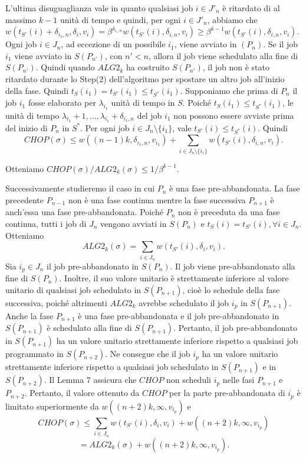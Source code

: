 \documentclass[12pt]{article}
\begin{document}
L'ultima disuguaglianza vale in quanto qualsiasi job $i \in J'_{n}$ è ritardato di al massimo $k - 1$ unità di tempo e quindi, per ogni $i \in J'_{n}$, abbiamo che $w(t_{S'}(i) + \delta_{i_{1}, n}, \delta_{i}, v_{i}) = \beta^{\delta_{i_{1},n}} w(t_{S'}(i), \delta_{i, n}, v_{i}) \geq \beta^{k - 1} w (t_{S'}(i), \delta_{i,n}, v_{i})$. Ogni job $i \in J_{n}$, ad eccezione di un possibile $i_{1}$, viene avviato in $ (P_{n})$. Se il job $i_{1}$ viene avviato in $S(P_{n'})$, con $n' < n$, allora il job viene schedulato alla fine di $S(P_{n'})$. Quindi quando $ALG2_{k}$ ha costruito $S(P_{n'})$, il job non è stato ritardato durante lo Step(2) dell'algoritmo per spostare un altro job all'inizio della fase. Quindi $t_{S}(i_{1}) = t_{S'}(i_{1}) \leq t_{S^{*}}(i_{1})$. Supponiamo che prima di $P_{n}$ il job $i_{1}$ fosse elaborato per $\lambda_{i_{1}}$ unità di tempo in $S$. Poiché $t_{S}(i_{1}) \leq t_{S^{*}} (i_{1})$, le unità di tempo $\lambda_{i_{1}} + 1, ... , \lambda_{i_{1}} + \delta_{i_{1},n}$ del job $i_{1}$ non possono essere avviate prima del inizio di $P_{n}$ in $S^{*}$. Per ogni job $i \in J_{n} \setminus \{i_{1}\}$, vale $t_{S'}(i) \leq t_{S^{*}}(i)$. Quindi
$$CHOP(\sigma) \leq w((n - 1)k, \delta_{i_{1},n}, v_{i_{1}}) + \sum_{i \in J_{n} \setminus \{i_{1}\}} w(t_{S'}(i), \delta_{i,n}, v_{i}).$$

Otteniamo $CHOP(\sigma) / ALG2_{k}(\sigma) \leq 1 / \beta^{k - 1}$.

Successivamente studieremo il caso in cui $P_{n}$ è una fase pre-abbandonata. La fase precedente $P_{n - 1}$ non è una fase continua mentre la fase successiva $P_{n+1}$ è anch'essa una fase pre-abbandonata. Poiché $P_{n}$ non è preceduta da una fase continua, tutti i job di $J_{n}$ vengono avviati in $S(P_{n})$ e $t_{S}(i) = t_{S'}(i), \forall i \in J_{n}$. Otteniamo
$$ALG2_{k} (\sigma) = \sum_{i \in J_{n}} w(t_{S'}(i), \delta_{i}, v_{i}).$$
Sia $i_{p} \in J_{n}$ il job pre-abbandonato in $S(P_{n})$. Il job viene pre-abbandonato alla fine di $S(P_{n})$. Inoltre, il suo valore unitario è strettamente inferiore al valore unitario di qualsiasi job schedulato in $S(P_{n+1})$, cioè lo schedule della fase successiva, poiché altrimenti $ALG2_{k}$ avrebbe schedulato il job $i_{p}$ in $S(P_{n+1})$. Anche la fase $P_{n+1}$ è una fase pre-abbandonata e il job pre-abbandonato in $S (P_{n+1})$ è schedulato alla fine di $S(P_{n+1})$. Pertanto, il job pre-abbandonato in $S(P_{n+1})$ ha un valore unitario strettamente inferiore rispetto a qualsiasi job programmato in $S(P_{n + 2})$. Ne consegue che il job $i_{p}$ ha un valore unitario strettamente inferiore rispetto a qualsiasi job schedulato in $S (P_{n+1})$ e in $S (P_{n+2})$. Il Lemma 7 assicura che $CHOP$ non scheduli $i_{p}$ nelle fasi $P_{n+1}$ e $P_{n+2}$. Pertanto, il valore ottenuto da $CHOP$ per la parte pre-abbandonata di $i_{p}$  è limitato superiormente da $w((n + 2) k, \infty, v_{i_{p}})$ e
$$CHOP(\sigma) \leq \sum_{i \in J_{n}} w(t_{S'}(i), \delta_{i}, v_{i}) + w((n + 2)k, \infty, v_{i_{p}})$$ 
$$ = ALG2_{k}(\sigma) + w((n + 2)k, \infty , v_{i_{p}}).$$
\end{document}
